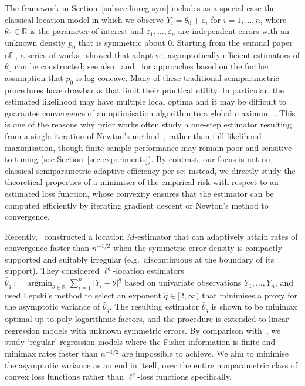 \documentclass[a4paper]{article}
\newcommand{\R}{\mathbb{R}}
\DeclareMathOperator*{\argmin}{argmin}
\theoremstyle{definition}
\begin{document}
The framework in Section~\ref{subsec:linreg-sym} includes as a special case the classical location model in which we observe $Y_i = \theta_0 + \varepsilon_i$ for $i = 1,\dotsc,n$, where $\theta_0 \in \R$ is the parameter of interest and $\varepsilon_1,\dotsc,\varepsilon_n$ are independent errors with an unknown density $p_0$ that is symmetric about 0. Starting from the seminal paper of~\citet{stein1956efficient}, a series of works~\citep[e.g.][]{van1970efficiency,stone1975adaptive,beran1978efficient,bickel1982adaptive,schick1986asymptotically,faraway1992smoothing,dalalyan2006penalized,vdV2021stein,gupta2023finite} showed that adaptive, asymptotically efficient estimators of $\theta_0$ can be constructed; see also~\citet{doss2019univariate} and~\citet{laha2021adaptive} for approaches based on the further assumption that $p_0$ is log-concave. Many of these traditional semiparametric procedures have drawbacks that limit their practical utility. In particular, the estimated likelihood may have multiple local optima and it may be difficult to guarantee convergence of an optimisation algorithm to a global maximum~\citep[Example~5.50]{vdV1998asymptotic}. This is one of the reasons why prior works often study a one-step estimator resulting from a single iteration of Newton’s method~\citep{bickel1975one,jin1990empirical,mammen1997optimal,laha2021adaptive}, rather than full likelihood maximisation, though finite-sample performance may remain poor and sensitive to tuning (see Section~\ref{sec:experiments}).  By contrast, our focus is not on classical semiparametric adaptive efficiency per se; instead, we directly study the theoretical properties of a minimiser of the empirical risk with respect to an estimated loss function, whose convexity ensures that the estimator can be computed efficiently by iterating gradient descent or Newton's method to convergence.

Recently,~\citet{kao24choosing} constructed a location $M$-estimator that can adaptively attain rates of convergence faster than $n^{-1/2}$ when the symmetric error density is compactly supported and suitably irregular (e.g.\ discontinuous at the boundary of its support). They considered $\ell^q$-location estimators $\hat{\theta}_q := \argmin_{\theta \in \R} \sum_{i=1}^n |Y_i - \theta|^q$ based on univariate observations $Y_1,\dotsc,Y_n$, and used Lepski's method to select an exponent $\hat{q} \in [2,\infty)$ that minimises a proxy for the asymptotic variance of $\hat{\theta}_q$. The resulting estimator $\hat{\theta}_{\hat{q}}$ is shown to be minimax optimal up to poly-logarithmic factors, and the procedure is extended to linear regression models with unknown symmetric errors. By comparison with~\citet{kao24choosing}, we study `regular' regression models where the Fisher information is finite and minimax rates faster than $n^{-1/2}$ are impossible to achieve.  We aim to minimise the asymptotic variance as an end in itself, over the entire nonparametric class of convex loss functions rather than $\ell^q$-loss functions specifically.
\end{document}
